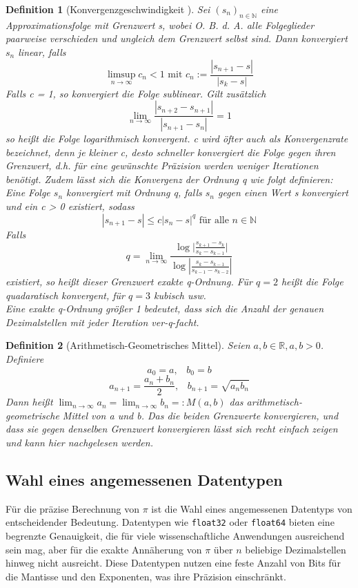 \documentclass{scrartcl}
\newtheorem{definition}{Definition}
\newtheorem{approximation sequence}{Annäherungsfolge}
\begin{document}
\begin{definition}[Konvergenzgeschwindigkeit \cite{Konvergenzgeschwindigkeit}]
    Sei \((s_n)_{n \in \mathbb{N}}\) eine Approximationsfolge mit Grenzwert s, wobei O. B. d. A. alle Folgeglieder paarweise verschieden und ungleich dem Grenzwert selbst sind.
    Dann konvergiert \(s_n\) linear, falls
    \[\limsup_{n \to \infty} c_n < 1 \text{ mit } c_n := \frac{|s_{n+1}-s|}{|s_k-s|} \]
    Falls c = 1, so konvergiert die Folge sublinear.
    Gilt zusätzlich 
    \[\lim_{n \to \infty} \frac{|s_{n+2}-s_{n+1}|}{|s_{n+1}-s_n|} = 1\]
    so heißt die Folge logarithmisch konvergent.
    c wird öfter auch als Konvergenzrate bezeichnet, denn je kleiner c, desto schneller konvergiert die Folge gegen ihren Grenzwert, 
    d.h. für eine gewünschte Präzision werden weniger Iterationen benötigt.
    Zudem lässt sich die Konvergenz der Ordnung q wie folgt definieren:
    Eine Folge \(s_n\) konvergiert mit Ordnung q, falls \(s_n\) gegen einen Wert s konvergiert und ein c > 0 existiert, sodass
    \[|s_{n+1} - s| \leqslant c|s_n - s|^q \text{ für alle } n \in \mathbb{N}\]
    Falls
    \[q = \lim_{n \to \infty} \frac{\log|{\frac{s_{k+1} - s_k}{s_k - s_{k-1}}|}}{\log{|\frac{s_k - s_{k-1}}{s_{k-1} - s_{k-2}}|}} \]
    existiert, so heißt dieser Grenzwert exakte q-Ordnung.
    Für \(q = 2\) heißt die Folge quadaratisch konvergent, für \(q = 3 \) kubisch usw. \\
    Eine exakte q-Ordnung größer 1 bedeutet, dass sich die Anzahl der genauen Dezimalstellen mit jeder Iteration ver-q-facht.
\end{definition}

\begin{definition}[Arithmetisch-Geometrisches Mittel]
  Seien \(a, b \in \mathbb{R}, a,b > 0\). Definiere 
  \[a_0 = a, \;\;\; b_0 = b\]
  \[a_{n+1} = \frac{a_n + b_n}{2}, \;\;\; b_{n+1} = \sqrt{a_n b_n}\]
  Dann heißt \(\lim_{n \to \infty}a_n = \lim_{n \to \infty} b_n =: M(a,b) \) das arithmetisch-geometrische Mittel von a und b.
  Das die beiden Grenzwerte konvergieren, und dass sie gegen denselben Grenzwert konvergieren lässt sich recht einfach zeigen und kann 
  hier \cite{AGM} nachgelesen werden.
\end{definition}


\subsection{Wahl eines angemessenen Datentypen}

Für die präzise Berechnung von \(\pi\) ist die Wahl eines angemessenen
Datentyps von entscheidender Bedeutung. Datentypen wie \texttt{float32} oder
\texttt{float64} bieten eine begrenzte Genauigkeit, die für viele
wissenschaftliche Anwendungen ausreichend sein mag, aber für die exakte
Annäherung von \(\pi\) über \(n\) beliebige Dezimalstellen hinweg nicht
ausreicht.
Diese Datentypen nutzen eine feste Anzahl von Bits für die Mantisse und den
Exponenten, was ihre Präzision einschränkt.
\end{document}
